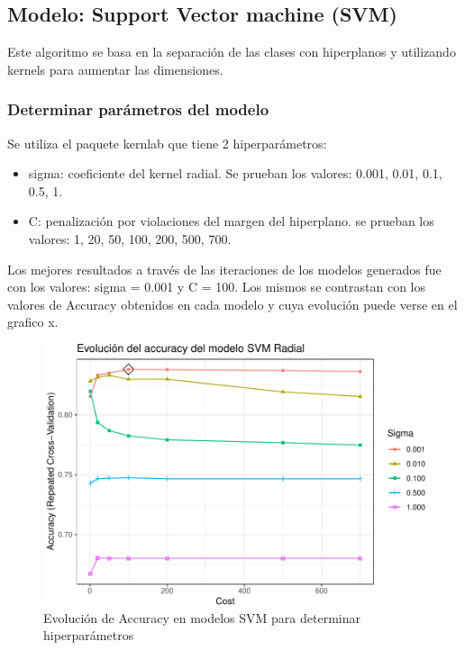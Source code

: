 \subsection{Modelo: Support Vector machine (SVM)}

Este algoritmo se basa en la separación de las clases con hiperplanos y
utilizando kernels para aumentar las dimensiones.

\subsubsection{Determinar parámetros del modelo}
Se utiliza el paquete kernlab que tiene 2 hiperparámetros:

\begin{itemize}
	\item
	sigma: coeficiente del kernel radial. Se prueban los valores: 0.001,
	0.01, 0.1, 0.5, 1.
	\item
	C: penalización por violaciones del margen del hiperplano. se prueban
	los valores: 1, 20, 50, 100, 200, 500, 700.
\end{itemize}

Los mejores resultados a través de las iteraciones de los modelos
generados fue con los valores: sigma = 0.001 y C = 100. Los mismos se
contrastan con los valores de Accuracy obtenidos en cada modelo y cuya
evolución puede verse en el grafico x.



\begin{figure}[!htb]
	\centering
	\includegraphics{imagenes/modelos_varios/unnamed-chunk-32-1.pdf}
	\caption{Evolución de Accuracy en modelos SVM para determinar hiperparámetros}
	\label{fig:svm_hiperparam}
\end{figure}



